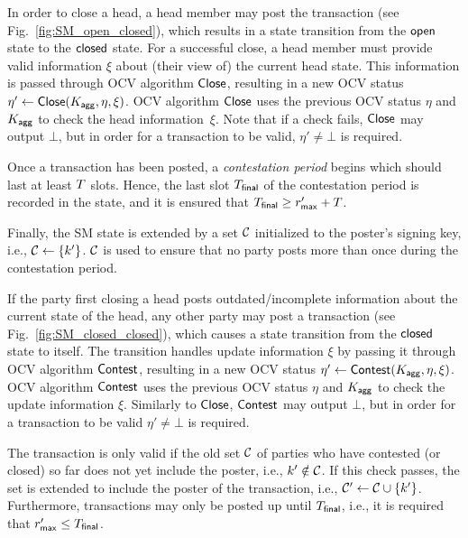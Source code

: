  In order to close a head, a head
member may post the \mtxClose{} transaction (see
Fig.~\ref{fig:SM_open_closed}), which results in a state transition
from the $\mathsf{open}$ state to the $\mathsf{closed}$ state.  For a successful
close, a head member must provide valid information $\xi$ about (their
view of) the current head state.  This information is passed through
OCV algorithm $\mathsf{Close}$, resulting in a new OCV status
$\eta' \gets \mathsf{Close}(K_{\mathsf{agg}},\eta,\xi)$.  OCV algorithm $\mathsf{Close}$
uses the previous OCV status $\eta$ and $K_{\mathsf{agg}}$ to check the head
information~$\xi$.  Note that if a check fails, $\mathsf{Close}$ may output
$\bot$, but in order for a \mtxClose{} transaction to be valid,
$\eta' \neq \bot$ is required.

Once a \mtxClose{} transaction has been posted, a \emph{contestation period}
begins which should last at least $T$ slots.  Hence, the last slot
$T_{\mathsf{final}}$ of the contestation period is recorded in the state, and it
is ensured that $T_{\mathsf{final}} \geq r_{\mathsf{max}}' + T$.

Finally, the SM state is extended by a set $\mathcal C$
initialized to the poster's signing key, i.e.,
$\mathcal C \gets \{k'\}$.   $\mathcal C$ is used to ensure that no party
posts more than once during the contestation period.





 If the party first closing a head posts
outdated/incomplete information about the current state of the head,
any other party may post a \mtxContest{} transaction (see
Fig.~\ref{fig:SM_closed_closed}), which causes a state transition from
the $\mathsf{closed}$ state to itself.  The transition handles update
information $\xi$ by passing it through OCV algorithm $\mathsf{Contest}$,
resulting in a new OCV status
$\eta' \gets \mathsf{Contest} (K_{\mathsf{agg}},\eta,\xi)$.  OCV algorithm
$\mathsf{Contest}$ uses the previous OCV status $\eta$ and $K_{\mathsf{agg}}$ to check
the update information $\xi$.  Similarly to $\mathsf{Close}$, $\mathsf{Contest}$
may output $\bot$, but in order for a \mtxContest{} transaction to be
valid $\eta' \neq \bot$ is required.

The \mtxContest{} transaction is only valid if the old set
$\mathcal C$ of parties who have contested (or closed) so far does not yet
include the poster, i.e., $k' \notin \mathcal C$.  If this check
passes, the set is extended to include the poster of the \mtxContest{}
transaction, i.e., $\mathcal C' \gets \mathcal C \cup \{k'\}$.
Furthermore, \mtxContest{} transactions may only be posted up until
$T_{\mathsf{final}}$, i.e., it is required that $r_{\mathsf{max}}' \leq T_{\mathsf{final}}$.


